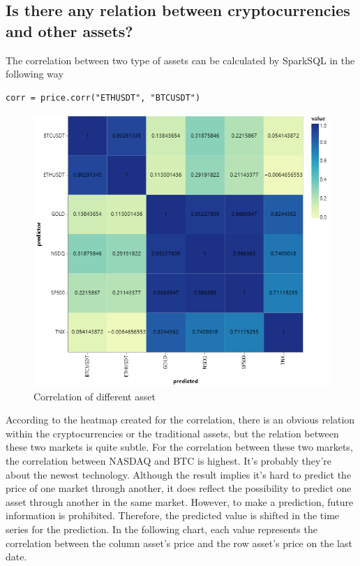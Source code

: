 \documentclass[a4paper]{article}
\begin{document}
\subsection{Is there any relation between cryptocurrencies and other assets?}
The correlation between two type of assets can be calculated by SparkSQL in the following way
\begin{verbatim}
corr = price.corr("ETHUSDT", "BTCUSDT")
\end{verbatim}
\begin{figure}[H]
    \centering
    \includegraphics[scale=0.4]{Q6.png}
    \caption{Correlation of different asset}
\end{figure}
According to the heatmap created for the correlation, there is an obvious relation within the cryptocurrencies or the traditional assets, but the relation between these two markets is quite subtle. For the correlation between these two markets, the correlation between NASDAQ and BTC is highest. It's probably they're about the newest technology. Although the result implies it's hard to predict the price of one market through another, it does reflect the possibility to predict one asset through another in the same market. However, to make a prediction, future information is prohibited. Therefore, the predicted value is shifted in the time series for the prediction. In the following chart, each value represents the correlation between the column asset's price and the row asset's price on the last date.
\end{document}
